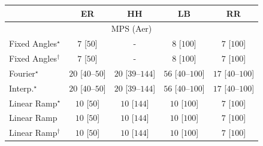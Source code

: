 \begin{tabular}{l|cccc|}
\toprule
            & ER & HH & LB & RR \\
\midrule
\multicolumn{5}{c}{\rule{0pt}{8pt}MPS (Aer)} \\
\midrule
Fixed Angles$^\star$ & {\cellcolor[HTML]{F7FCF5}} \color[HTML]{000000} $7$ [$50$] & {\cellcolor[HTML]{000000}} \color[HTML]{F1F1F1} {\cellcolor{white}} \color{black} - & {\cellcolor[HTML]{F7FCF5}} \color[HTML]{000000} $8$ [$100$] & {\cellcolor[HTML]{F7FCF5}} \color[HTML]{000000} $7$ [$100$] \\
Fixed Angles$^\dagger$ & {\cellcolor[HTML]{F7FCF5}} \color[HTML]{000000} $7$ [$50$] & {\cellcolor[HTML]{000000}} \color[HTML]{F1F1F1} {\cellcolor{white}} \color{black} - & {\cellcolor[HTML]{F7FCF5}} \color[HTML]{000000} $8$ [$100$] & {\cellcolor[HTML]{F7FCF5}} \color[HTML]{000000} $7$ [$100$] \\
Fourier$^\star$ & {\cellcolor[HTML]{F5FBF2}} \color[HTML]{000000} $20$ [$40$--$50$] & {\cellcolor[HTML]{F5FBF2}} \color[HTML]{000000} $20$ [$39$--$144$] & {\cellcolor[HTML]{EFF9EB}} \color[HTML]{000000} $56$ [$40$--$100$] & {\cellcolor[HTML]{F5FBF3}} \color[HTML]{000000} $17$ [$40$--$100$] \\
Interp.$^\star$ & {\cellcolor[HTML]{F5FBF2}} \color[HTML]{000000} $20$ [$40$--$50$] & {\cellcolor[HTML]{F5FBF2}} \color[HTML]{000000} $20$ [$39$--$144$] & {\cellcolor[HTML]{EFF9EB}} \color[HTML]{000000} $56$ [$40$--$100$] & {\cellcolor[HTML]{F5FBF3}} \color[HTML]{000000} $17$ [$40$--$100$] \\
Linear Ramp$^\star$ & {\cellcolor[HTML]{F7FCF5}} \color[HTML]{000000} $10$ [$50$] & {\cellcolor[HTML]{F7FCF5}} \color[HTML]{000000} $10$ [$144$] & {\cellcolor[HTML]{F7FCF5}} \color[HTML]{000000} $10$ [$100$] & {\cellcolor[HTML]{F7FCF5}} \color[HTML]{000000} $7$ [$100$] \\
Linear Ramp & {\cellcolor[HTML]{F7FCF5}} \color[HTML]{000000} $10$ [$50$] & {\cellcolor[HTML]{F7FCF5}} \color[HTML]{000000} $10$ [$144$] & {\cellcolor[HTML]{F7FCF5}} \color[HTML]{000000} $10$ [$100$] & {\cellcolor[HTML]{F7FCF5}} \color[HTML]{000000} $7$ [$100$] \\
Linear Ramp$^\dagger$ & {\cellcolor[HTML]{F7FCF5}} \color[HTML]{000000} $10$ [$50$] & {\cellcolor[HTML]{F7FCF5}} \color[HTML]{000000} $10$ [$144$] & {\cellcolor[HTML]{F7FCF5}} \color[HTML]{000000} $10$ [$100$] & {\cellcolor[HTML]{F7FCF5}} \color[HTML]{000000} $7$ [$100$] \\

\end{tabular}
